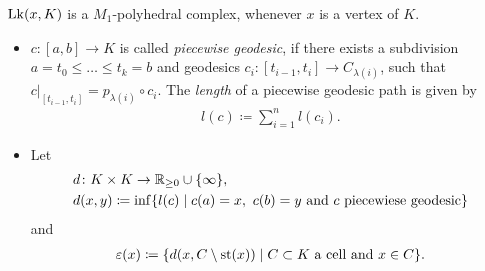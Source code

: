 \begin{rem}
  \(\operatorname{Lk}(x, K)\) is a \(M_1\)-polyhedral complex, whenever \(x\) is a vertex of \(K\).
\end{rem}

\begin{bsp}
\end{bsp}

\begin{defin}
  \begin{itemize}
  \item \(c\colon [a, b] \to K\) is called \emph{piecewise geodesic}, if there exists a subdivision \(a = t_0 \leq \dots \leq t_k = b\) and geodesics \(c_i\colon [t_{i-1}, t_i] \to C_{\lambda(i)}\), such that \(c|_{[t_{i-1}, t_i]} = p_{\lambda(i)} \circ c_i\). The \emph{length} of a piecewise geodesic path is given by
    \begin{align*}
      l(c) \coloneqq \sum_{i=1}^n l(c_i).
    \end{align*}
  \item Let
    \begin{align*}
      &d\colon K \times K \to \mathbb{R}_{\geq 0} \cup \{\infty\},\\
      &d(x,y) \coloneqq \inf\{l(c) \mid c(a) = x,\ c(b) = y \text{ and } c \text{ piecewiese geodesic}\}
    \end{align*}
    and
    \begin{align}
      \varepsilon(x) \coloneqq \{d(x, C \setminus \operatorname{st}(x)) \mid C \subset K \text{ a cell and } x \in C\}. \label{eq:epsilon}
    \end{align}

  \end{itemize}
\end{defin}


